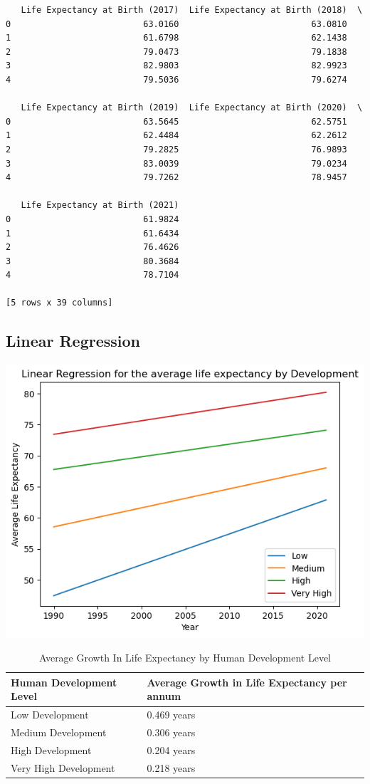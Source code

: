 \documentclass[twocolumn, switch]{article}
\begin{document}
\begin{verbatim}
   Life Expectancy at Birth (2017)  Life Expectancy at Birth (2018)  \
0                          63.0160                          63.0810   
1                          61.6798                          62.1438   
2                          79.0473                          79.1838   
3                          82.9803                          82.9923   
4                          79.5036                          79.6274   

   Life Expectancy at Birth (2019)  Life Expectancy at Birth (2020)  \
0                          63.5645                          62.5751   
1                          62.4484                          62.2612   
2                          79.2825                          76.9893   
3                          83.0039                          79.0234   
4                          79.7262                          78.9457   

   Life Expectancy at Birth (2021)  
0                          61.9824  
1                          61.6434  
2                          76.4626  
3                          80.3684  
4                          78.7104  

[5 rows x 39 columns]
\end{verbatim}

\subsection{Linear Regression}

\includegraphics[width=0.7\linewidth]{files/2696926812c48737a0885ddaedea1dbc.png}

\begin{table}
\centering
\caption*{Average Growth In Life Expectancy by Human Development Level}
\begin{tabular}{p{}p{}}
\toprule
Human Development Level & Average Growth in Life Expectancy per annum \\
\hline
Low Development & 0.469 years \\
Medium Development & 0.306 years \\
High Development & 0.204 years \\
Very High Development & 0.218 years \\
\bottomrule
\end{tabular}
\end{table}
\end{document}
